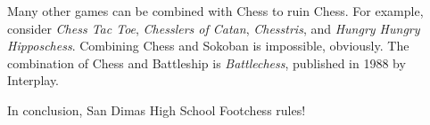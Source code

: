 \documentclass[twocolumn]{article}
\begin{document}
Many other games can be combined with Chess to ruin Chess. For example,
consider {\em Chess Tac Toe}, {\em Chesslers of Catan}, {\em Chesstris},
and {\em Hungry Hungry Hipposchess}. Combining Chess and Sokoban is
impossible, obviously. The combination of Chess and Battleship is
{\em Battlechess}, published in 1988 by Interplay.

\medskip
\medskip
In conclusion, San Dimas High School Footchess rules!


% 







%



{}

\end{document}
